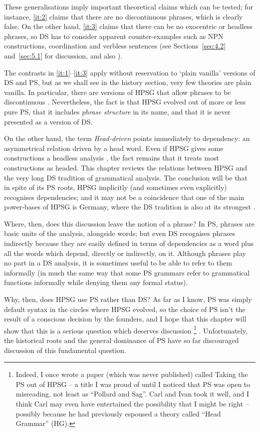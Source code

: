 \documentclass[output=paper]{langscibook}
\begin{document}
These generalisations imply important theoretical claims which can be tested; for instance, \ref{it:2} claims that there are no discontinuous phrases, which is clearly false. On the other hand, \ref{it:3} claims that there can be no exocentric or headless phrases, so DS has to consider apparent counter-examples such as NPN constructions, coordination and verbless sentences (see Sections~\ref{sec:4.2} and~\ref{sec:5.1} for discussion, and also ).

The contrasts in \ref{it:1}--\ref{it:3} apply without reservation to ‘plain vanilla’ \citep{Zwicky1985} versions of DS and PS, but as we shall see in the history section, very few theories are plain vanilla. In particular, there are versions of HPSG that allow phrases to be discontinuous \citep{Reape94a,Kathol2000a,Mueller95c,Babel}. Nevertheless, the fact is that HPSG evolved out of more or less pure PS, that it includes \emph{phrase structure} in its name, and that it is never presented as a version of DS.

On the other hand, the term \emph{Head-driven} points immediately to dependency: an asymmetrical relation driven by a head word. Even if HPSG gives some constructions a headless analysis \citep[654-666]{MuellerGT-Eng2}, the fact remains that it treats most constructions as headed.
This chapter reviews the relations between HPSG and the very long DS tradition of grammatical analysis. The conclusion will be that in spite of its PS roots, HPSG implicitly (and sometimes even explicitly) recognises dependencies; and it may not be a coincidence that one of the main power-bases of HPSG is Germany, where the DS tradition is also at its strongest  \citep[359]{MuellerGT-Eng2}.

Where, then, does this discussion leave the notion of a phrase? In PS, phrases are basic units of the analysis, alongside words; but even DS recognises phrases indirectly because they are easily defined in terms of dependencies as a word plus all the words which depend, directly or indirectly, on it. Although phrases play no part in a DS analysis, it is sometimes useful to be able to refer to them informally (in much the same way that some PS grammars refer to grammatical functions informally while denying them any formal status).

Why, then, does HPSG use PS rather than DS? As far as I know, PS was simply default syntax in the circles where HPSG evolved, so the choice of PS isn’t the result of a conscious decision by the founders, and I hope that this chapter will show that this is a serious question which deserves discussion%
%
\footnote{Indeed, I once wrote a paper (which was never published) called Taking the PS out of HPSG – a title I was proud of until I noticed that PS was open to misreading, not least as ``Pollard and Sag''. Carl and Ivan took it well, and I think Carl may even have entertained the possibility that I might be right – possibly because he had previously espoused a theory called ``Head Grammar'' (HG).}%
%
. Unfortunately, the historical roots and the general dominance of PS have so far discouraged discussion of this fundamental question.
\end{document}
